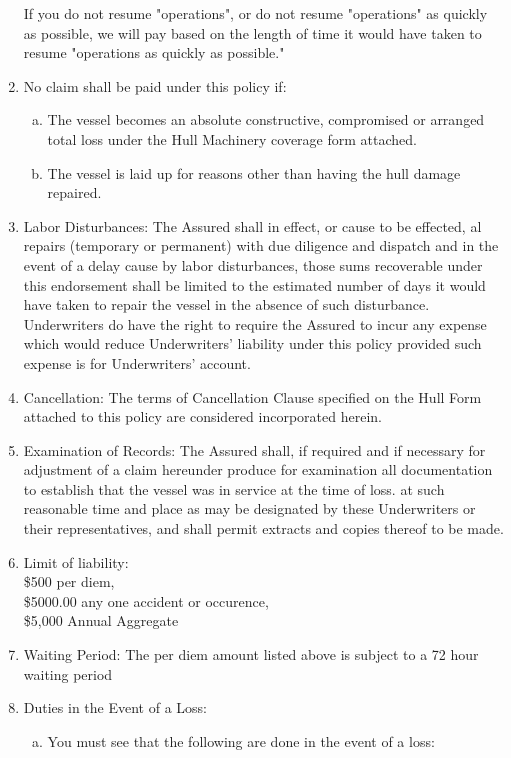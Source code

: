 \documentclass[10pt]{article}
\begin{document}
\begin{enumerate}
        If you do not resume "operations", or do not resume "operations" as quickly as possible, we will pay based on the length of time it would have taken to resume "operations as quickly as possible."         
    \item No claim shall be paid under this policy if:
        \begin{enumerate}[a.]
        \item The vessel becomes an absolute constructive, compromised or arranged total loss under the Hull Machinery coverage form attached.
        \item The vessel is laid up for reasons other than having the hull damage repaired.
        \end{enumerate}
    \item Labor Disturbances: The Assured shall in effect, or cause to be effected, al repairs (temporary or permanent) with due diligence and dispatch and in the event of a delay cause by labor disturbances, those sums recoverable under this endorsement shall be limited to the estimated number of days it would have taken to repair the vessel in the absence of such disturbance. Underwriters do have the right to require the Assured to incur any expense which would reduce Underwriters’ liability under this policy provided such expense is for Underwriters’ account. 
    \item Cancellation:  The terms of Cancellation Clause specified on the Hull Form attached to this policy are considered incorporated herein.
    \item Examination of Records: The Assured shall, if required and if necessary for adjustment of a claim hereunder produce for examination all documentation to establish that the vessel was in service at the time of loss. at such reasonable time and place as may be designated by these Underwriters or their representatives, and shall permit extracts and copies thereof to be made.
    \item Limit of liability: \\ \$500 per diem, \\ \$5000.00 any one accident or occurence, \\ \$5,000 Annual Aggregate
    \item Waiting Period:  The per diem amount listed above is subject to a 72 hour waiting period
    \item Duties in the Event of a Loss:
        \begin{enumerate}[a.]
        \item You must see that the following are done in the event of a loss:

\end{enumerate}
\end{enumerate}
\end{document}
